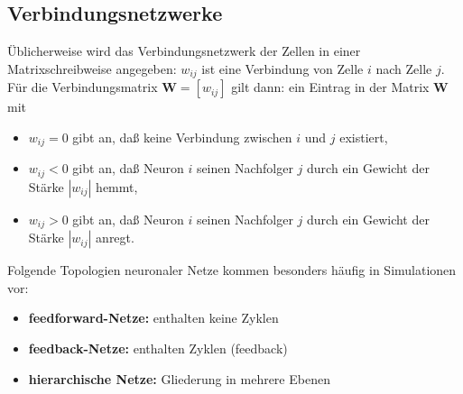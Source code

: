 \subsection{Verbindungsnetzwerke}
Üblicherweise wird das Verbindungsnetzwerk der Zellen in
einer Matrixschreibweise angegeben: $w_{ij}$ ist eine Verbindung von Zelle $i$ nach Zelle $j$. Für die Verbindungsmatrix $\textbf{W} = [w_{ij}]$ gilt dann: ein Eintrag in der Matrix $\textbf{W}$ mit
\begin{itemize}
\item $w_{ij} = 0$ gibt an, daß keine Verbindung zwischen $i$ und $j$ existiert,
\item $w_{ij} < 0$ gibt an, daß Neuron $i$ seinen Nachfolger $j$ durch ein Gewicht der
Stärke $|w_{ij}|$ hemmt,
\item $w_{ij} > 0$ gibt an, daß Neuron $i$ seinen Nachfolger $j$ durch ein Gewicht der
Stärke $|w_{ij}|$ anregt.
\end{itemize}

Folgende Topologien neuronaler Netze kommen besonders häufig in Simulationen vor:
\begin{itemize}
\item \textbf{feedforward-Netze:} enthalten keine Zyklen
\item \textbf{feedback-Netze:} enthalten Zyklen (feedback)
\item \textbf{hierarchische Netze:} Gliederung in mehrere Ebenen
\end{itemize}

